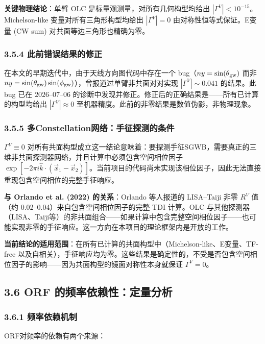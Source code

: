 \documentclass[12pt,a4paper]{article}
\begin{document}
\textbf{关键物理结论}：单臂 OLC 是标量观测量，对所有几何构型均给出 $|\Gamma^V| < 10^{-15}$。Michelson-like 变量对所有三角形构型均给出 $|\Gamma^V| = 0$ 由对称性恒等式保证。E变量 (CW sum) 对共面等边三角形也精确为零。

\subsubsection{3.5.4 此前错误结果的修正}

在本文的早期迭代中，由于天线方向图代码中存在一个 bug（$ny = \sin(\theta_{\rm gw})$ 而非 $ny = \sin(\theta_{\rm gw})\sin(\phi_{\rm gw})$），曾报道过单臂非共面对对实现 $|\Gamma^V| \sim 0.041$ 的结果。此 bug 已在 $2026$–$07$–$06$ 的诊断中发现并修正。修正后的正确结果是——所有已计算的构型均给出 $|\Gamma^V| \approx 0$ 至机器精度。此前的非零结果是数值伪影，非物理现象。

\subsubsection{3.5.5 多Constellation网络：手征探测的条件}

$\Gamma^V \equiv 0$ 对所有共面构型成立这一结论意味着：要探测手征SGWB，需要真正的三维非共面探测器网络，并且计算中必须包含空间相位因子 $\exp[-2\pi i \hat{k} \cdot (\vec{x}_1 - \vec{x}_2)]$。当前项目的代码尚未实现该相位因子，因此无法直接重现包含空间相位的完整手征响应。

\textbf{与 Orlando et al. (2022) 的关系}：Orlando 等人报道的 LISA–Taiji 非零 $R^V$ 值（约 0.02–0.04）来自包含空间相位因子的完整 TDI 计算。OLC 与其他探测器（LISA、Taiji等）的非共面组合——如果计算中包含完整空间相位因子——也可能实现非零的手征响应。这一方向在本项目的理论框架内是开放的工作。

\textbf{当前结论的适用范围}：在所有已计算的共面构型中（Michelson-like、E变量、TF-free 以及自相关），手征响应均为零。这些结果是确定性的，不受是否包含空间相位因子的影响——因为共面构型的镜面对称性本身就保证 $\Gamma^V = 0$。

\subsection{3.6 ORF 的频率依赖性：定量分析}


\subsubsection{3.6.1 频率依赖机制}


ORF对频率的依赖有两个来源：
\end{document}
